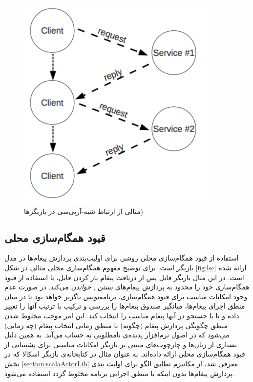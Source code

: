 \begin{figure}
    \begin{center}
	\includegraphics[width=10cm]{3-RelatedWork/Figures/RPC.pdf}
    \end{center}
    \caption{\label{fig:rpc} مثالی از ارتباط شبه-آرپی‌سی در بازیگرها) }
\end{figure}
 
\subsection{قیود همگام‌سازی محلی}
استفاده از قیود همگام‌سازی محلی روشی برای اولیت‌بندی پردازش پیغام‌ها در مدل بازیگر است\cite{FrolundCoord}. برای توضیح مفهوم همگام‌سازی محلی مثالی در شکل \ref{fig:lsc} ارائه شده است. در این مثال بازیگر فایل پس از دریافت پیغام باز کردن فایل، با استفاده از قیود همگام‌سازی خود را محدود به پردازش پیغام‌های \textit{بستن} , \textit{خواندن} می‌کند. در صورت عدم وجود امکانات مناسب برای قیود همگام‌سازی، برنامه‌نویس ناگزیر خواهد بود تا در میان منطق اجرای پیغام‌ها، میانگیر صندوق پیغام‌ها را بررسی و ترکیب یا ترتیب آنها را تغییر داده و یا با جستجو در آنها پیغام مناسب را انتخاب کند. این امر موجب مخلوط شدن منطق چگونگی پردازش پیغام  (چگونه) با منطق زمانی انتخاب پیغام (چه زمانی) می‌شود که در اصول نرم‌افزار پدیده‌ی نامطلوبی به حساب می‌آید\cite{KarmaniAgha_Actors_11}. به همین دلیل بسیاری از زبان‌ها و چارچوب‌های مبتنی بر بازیگر امکانات مناسبی برای پشتیبانی از قیود‌ همگام‌سازی محلی ارائه داده‌اند. به عنوان مثال در کتابخانه‌ی بازیگر اسکالا که در بخش \ref{section:scalaActorLib} معرفی شد، از مکانیزم تطابق الگو برای اولیت بندی پردازش پیغام‌ها بدون اینکه با منطق اجرایی برنامه مخلوط گردد استفاده می‌شود.



